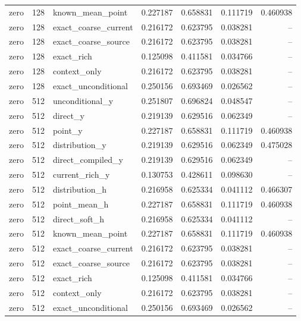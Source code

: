 \begin{longtable}{lllrrrr}
zero & 128 & known\_mean\_point & 0.227187 & 0.658831 & 0.111719 & 0.460938 \\
zero & 128 & exact\_coarse\_current & 0.216172 & 0.623795 & 0.038281 & -- \\
zero & 128 & exact\_coarse\_source & 0.216172 & 0.623795 & 0.038281 & -- \\
zero & 128 & exact\_rich & 0.125098 & 0.411581 & 0.034766 & -- \\
zero & 128 & context\_only & 0.216172 & 0.623795 & 0.038281 & -- \\
zero & 128 & exact\_unconditional & 0.250156 & 0.693469 & 0.026562 & -- \\
zero & 512 & unconditional\_y & 0.251807 & 0.696824 & 0.048547 & -- \\
zero & 512 & direct\_y & 0.219139 & 0.629516 & 0.062349 & -- \\
zero & 512 & point\_y & 0.227187 & 0.658831 & 0.111719 & 0.460938 \\
zero & 512 & distribution\_y & 0.219139 & 0.629516 & 0.062349 & 0.475028 \\
zero & 512 & direct\_compiled\_y & 0.219139 & 0.629516 & 0.062349 & -- \\
zero & 512 & current\_rich\_y & 0.130753 & 0.428611 & 0.098630 & -- \\
zero & 512 & distribution\_h & 0.216958 & 0.625334 & 0.041112 & 0.466307 \\
zero & 512 & point\_mean\_h & 0.227187 & 0.658831 & 0.111719 & 0.460938 \\
zero & 512 & direct\_soft\_h & 0.216958 & 0.625334 & 0.041112 & -- \\
zero & 512 & known\_mean\_point & 0.227187 & 0.658831 & 0.111719 & 0.460938 \\
zero & 512 & exact\_coarse\_current & 0.216172 & 0.623795 & 0.038281 & -- \\
zero & 512 & exact\_coarse\_source & 0.216172 & 0.623795 & 0.038281 & -- \\
zero & 512 & exact\_rich & 0.125098 & 0.411581 & 0.034766 & -- \\
zero & 512 & context\_only & 0.216172 & 0.623795 & 0.038281 & -- \\
zero & 512 & exact\_unconditional & 0.250156 & 0.693469 & 0.026562 & -- \\
\end{longtable}
